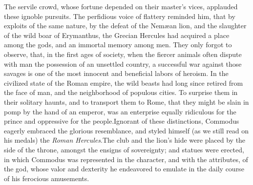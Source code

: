 
The servile crowd, whose fortune depended on their master’s
vices, applauded these ignoble pursuits. The perfidious voice of
flattery reminded him, that by exploits of the same nature, by
the defeat of the Nemæan lion, and the slaughter of the wild boar
of Erymanthus, the Grecian Hercules had acquired a place among
the gods, and an immortal memory among men. They only forgot to
observe, that, in the first ages of society, when the fiercer
animals often dispute with man the possession of an unsettled
country, a successful war against those savages is one of the
most innocent and beneficial labors of heroism. In the civilized
state of the Roman empire, the wild beasts had long since retired
from the face of man, and the neighborhood of populous cities. To
surprise them in their solitary haunts, and to transport them to
Rome, that they might be slain in pomp by the hand of an emperor,
was an enterprise equally ridiculous for the prince and
oppressive for the people.\footnotemark[30] Ignorant of these distinctions,
Commodus eagerly embraced the glorious resemblance, and styled
himself (as we still read on his medals\footnotemark[31])
the \textit{Roman Hercules}.\footnotemark[311]
The club and the lion’s hide were placed by the side of the
throne, amongst the ensigns of sovereignty; and statues were
erected, in which Commodus was represented in the character, and
with the attributes, of the god, whose valor and dexterity he
endeavored to emulate in the daily course of his ferocious
amusements.\footnotemark[32]




